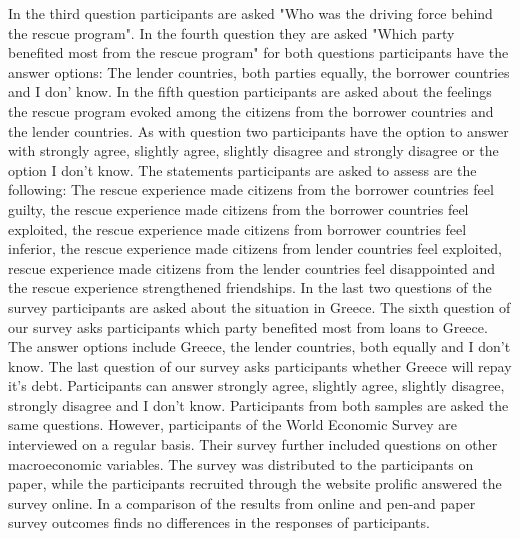 In the third question participants are asked "Who was the driving force behind the rescue program". In the fourth question they are asked "Which party benefited most from the rescue program" for both questions participants have the answer options: The lender countries, both parties equally, the borrower countries and I don' know. In the fifth question participants are asked about the feelings the rescue program evoked among the citizens from the borrower countries and the lender countries. As with question two participants have the option to answer with strongly agree, slightly agree, slightly disagree and strongly disagree or the option I don't know. The statements participants are asked to assess are the following: The rescue experience made citizens from the borrower countries feel guilty, the rescue experience made citizens from the borrower countries feel exploited, the rescue experience made citizens from borrower countries feel inferior, the rescue experience made citizens from lender countries feel exploited, rescue experience made citizens from the lender countries feel disappointed and the rescue experience strengthened friendships. In the last two questions of the survey participants are asked about the situation in Greece. The sixth question of our survey asks participants which party benefited most from loans to Greece. The answer options include Greece, the lender countries, both equally and I don't know. The last question of our survey asks participants whether Greece will repay it's debt. Participants can answer strongly agree, slightly agree, slightly disagree, strongly disagree and I don't know. Participants from both samples are asked the same questions. However, participants of the World Economic Survey are interviewed on a regular basis. Their survey further included questions on other macroeconomic variables. The survey was distributed to the participants on paper, while the participants recruited through the website prolific answered the survey online. In a comparison of the results from online and pen-and paper survey outcomes \cite{abel} finds no differences in the responses of participants. 


